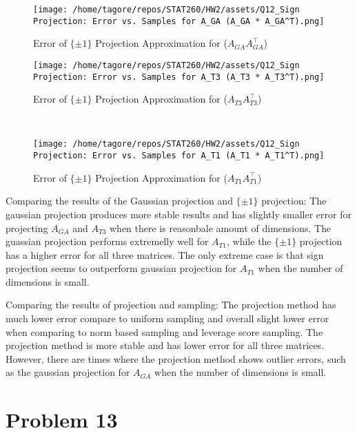 \documentclass{article}
\begin{document}
\begin{figure}[H]
    \centering
    \texttt{[image: /home/tagore/repos/STAT260/HW2/assets/Q12\_Sign Projection: Error vs. Samples for A\_GA (A\_GA * A\_GA^T).png]}
    \caption{Error of $\{\pm 1\}$ Projection Approximation for (\(A_{GA} A_{GA}^\top\))}
    \label{fig:GA_pm1_projection_error}
\end{figure}

\begin{figure}[H]
    \centering
    \texttt{[image: /home/tagore/repos/STAT260/HW2/assets/Q12\_Sign Projection: Error vs. Samples for A\_T3 (A\_T3 * A\_T3^T).png]}
    \caption{Error of $\{\pm 1\}$ Projection Approximation for (\(A_{T3} A_{T3}^\top\))}
    \label{fig:T3_pm1_projection_error}
\end{figure}\

\begin{figure}[H]
    \centering
    \texttt{[image: /home/tagore/repos/STAT260/HW2/assets/Q12\_Sign Projection: Error vs. Samples for A\_T1 (A\_T1 * A\_T1^T).png]}
    \caption{Error of $\{\pm 1\}$ Projection Approximation for (\(A_{T1} A_{T1}^\top\))}
    \label{fig:T1_pm1_projection_error}
\end{figure}

Comparing the results of the Gaussian projection and $\{\pm 1\}$ projection: The gaussian projection produces more stable results and has slightly smaller error for projecting $A_{GA}$ and $A_{T3}$ when there is reasonbale amount of dimensions. 
The guassian projection performs extremelly well for $A_{T1}$, while the $\{\pm 1\}$ projection has a higher error for all three matrices. The only extreme case is that sign projection seems to outperform gaussian projection for $A_{T1}$ when the number of dimensions is small.

Comparing the results of projection and sampling: The projection method has much lower error compare to uniform sampling and overall slight lower error when comparing to norm based sampling and leverage score sampling. The projection method is more stable and has lower error for all three matrices.
However, there are times where the projection method shows outlier errors, such as the gaussian projection for $A_{GA}$ when the number of dimensions is small.

\section*{Problem 13}
\end{document}
